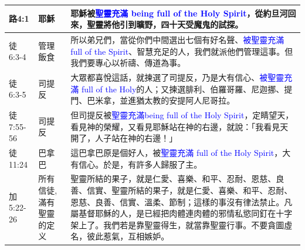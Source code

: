 \begin{table}[H]
\begin{tabular}{p{5em}|p{5em}|p{38em}}
路4:1&耶穌&耶穌被\textcolor{blue}{聖靈充滿 being full of the Holy Spirit}，從約旦河回來，聖靈將他引到曠野，四十天受魔鬼的試探。\\  \midrule
徒6:3-4&管理飯食&所以弟兄們，當從你們中間選出七個有好名聲、\textcolor{blue}{被聖靈充滿 full of the Spirit}、智慧充足的人，我們就派他們管理這事。但我們要專心以祈禱、傳道為事。\\  \midrule
徒6:3-5&司提反&大眾都喜悅這話，就揀選了司提反，乃是大有信心、\textcolor{blue}{被聖靈充滿 full of the Holy}的人；又揀選腓利、伯羅哥羅、尼迦挪、提門、巴米拿，並進猶太教的安提阿人尼哥拉。\\  \midrule
徒7:55-56&司提反&但司提反被\textcolor{blue}{聖靈充滿being full of the Holy Spirit}，定睛望天，看見神的榮耀，又看見耶穌站在神的右邊，就說：「我看見天開了，人子站在神的右邊！」\\  \midrule
徒11:24&巴拿巴&這巴拿巴原是個好人，被\textcolor{blue}{聖靈充滿 full of the Holy Spirit}，大有信心。於是，有許多人歸服了主。\\  \midrule
加5:22-26&所有信徒,滿有聖靈的定义&聖靈所結的果子，就是仁愛、喜樂、和平、忍耐、恩慈、良善、信實、聖靈所結的果子，就是仁愛、喜樂、和平、忍耐、恩慈、良善、信實、溫柔、節制；這樣的事沒有律法禁止。凡屬基督耶穌的人，是已經把肉體連肉體的邪情私慾同釘在十字架上了。我們若是靠聖靈得生，就當靠聖靈行事。不要貪圖虛名，彼此惹氣，互相嫉妒。\\  \midrule

\bottomrule
\end{tabular}
\end{table}




